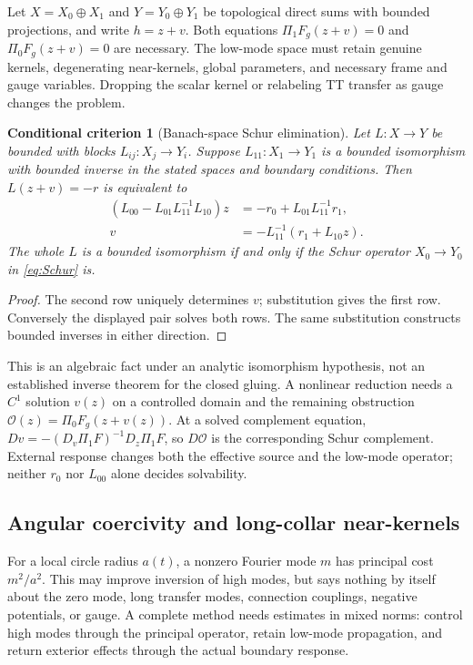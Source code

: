 \documentclass[a4paper,11pt]{article}
\newtheorem{criterion}[theorem]{Conditional criterion}
\theoremstyle{definition}
\begin{document}
Let $X=X_0\oplus X_1$ and $Y=Y_0\oplus Y_1$ be topological direct
sums with bounded projections, and write $h=z+v$.
Both equations $\Pi_1F_g(z+v)=0$ and $\Pi_0F_g(z+v)=0$ are necessary.
The low-mode space must retain genuine kernels, degenerating near-kernels,
global parameters, and necessary frame and gauge variables. Dropping
the scalar kernel or relabeling TT transfer as gauge changes the problem.

\begin{criterion}[Banach-space Schur elimination]\label{thm:Schur}
Let $L:X\to Y$ be bounded with blocks $L_{ij}:X_j\to Y_i$.
Suppose $L_{11}:X_1\to Y_1$ is a bounded isomorphism with bounded inverse
in the stated spaces and boundary conditions. Then
$L(z+v)=-r$ is equivalent to
\begin{align}
(L_{00}-L_{01}L_{11}^{-1}L_{10})z
 &=-r_0+L_{01}L_{11}^{-1}r_1,\label{eq:Schur}\\
v&=-L_{11}^{-1}(r_1+L_{10}z).\nonumber
\end{align}
The whole $L$ is a bounded isomorphism if and only if the Schur
operator $X_0\to Y_0$ in \eqref{eq:Schur} is.
\end{criterion}
\begin{proof}
The second row uniquely determines $v$; substitution gives the first
row. Conversely the displayed pair solves both rows. The same
substitution constructs bounded inverses in either direction.
\end{proof}
This is an algebraic fact under an analytic isomorphism hypothesis,
not an established inverse theorem for the closed gluing. A nonlinear
reduction needs a $C^1$ solution $v(z)$ on a controlled domain and the
remaining obstruction $\mathcal O(z)=\Pi_0F_g(z+v(z))$.
At a solved complement equation,
$Dv=-(D_v\Pi_1F)^{-1}D_z\Pi_1F$, so $D\mathcal O$ is the
corresponding Schur complement. External response changes both the
effective source and the low-mode operator; neither $r_0$ nor
$L_{00}$ alone decides solvability.

\subsection{Angular coercivity and long-collar near-kernels}\label{sec:angular}
For a local circle radius $a(t)$, a nonzero Fourier mode $m$ has
principal cost $m^2/a^2$. This may improve inversion of high modes,
but says nothing by itself about the zero mode, long transfer modes,
connection couplings, negative potentials, or gauge. A complete method
needs estimates in mixed norms: control high modes through the principal
operator, retain low-mode propagation, and return exterior effects
through the actual boundary response.
\end{document}
